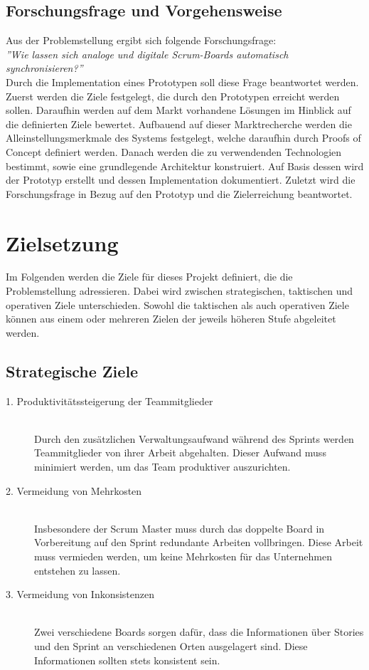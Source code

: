 \documentclass[12pt,titlepage]{scrartcl}
\begin{document}
		\subsection{Forschungsfrage und Vorgehensweise}
		Aus der Problemstellung ergibt sich folgende Forschungsfrage: \\
		\textit{''Wie lassen sich analoge und digitale Scrum-Boards automatisch synchronisieren?''} \\
		Durch die Implementation eines Prototypen soll diese Frage beantwortet werden. Zuerst werden die Ziele festgelegt, die durch den Prototypen erreicht werden sollen. Daraufhin werden auf dem Markt vorhandene Lösungen im Hinblick auf die definierten Ziele bewertet. Aufbauend auf dieser Marktrecherche werden die Alleinstellungsmerkmale des Systems festgelegt, welche daraufhin durch Proofs of Concept definiert werden. Danach werden die zu verwendenden Technologien bestimmt, sowie eine grundlegende Architektur konstruiert. Auf Basis dessen wird der Prototyp erstellt und dessen Implementation dokumentiert. Zuletzt wird die Forschungsfrage in Bezug auf den Prototyp und die Zielerreichung beantwortet.
	\newpage	
	\section{Zielsetzung} \label{Zielsetzung}
	Im Folgenden werden die Ziele für dieses Projekt definiert, die die Problemstellung adressieren. Dabei wird zwischen strategischen, taktischen und operativen Ziele unterschieden. Sowohl die taktischen als auch operativen Ziele können aus einem oder mehreren Zielen der jeweils höheren Stufe abgeleitet werden.
		\subsection{Strategische Ziele}
		\begin{description}
 			\item[1. Produktivitätssteigerung der Teammitglieder] \hfill \\
 			Durch den zusätzlichen Verwaltungsaufwand während des Sprints werden Teammitglieder von ihrer Arbeit abgehalten. Dieser Aufwand muss minimiert werden, um das Team produktiver auszurichten.
 			\item[2. Vermeidung von Mehrkosten] \hfill \\
 			Insbesondere der Scrum Master muss durch das doppelte Board in Vorbereitung auf den Sprint redundante Arbeiten vollbringen. Diese Arbeit muss vermieden werden, um keine Mehrkosten für das Unternehmen entstehen zu lassen.
 			\item[3. Vermeidung von Inkonsistenzen] \hfill \\
 			Zwei verschiedene Boards sorgen dafür, dass die Informationen über Stories und den Sprint an verschiedenen Orten ausgelagert sind. Diese Informationen sollten stets konsistent sein. 
		\end{description}
\end{document}
